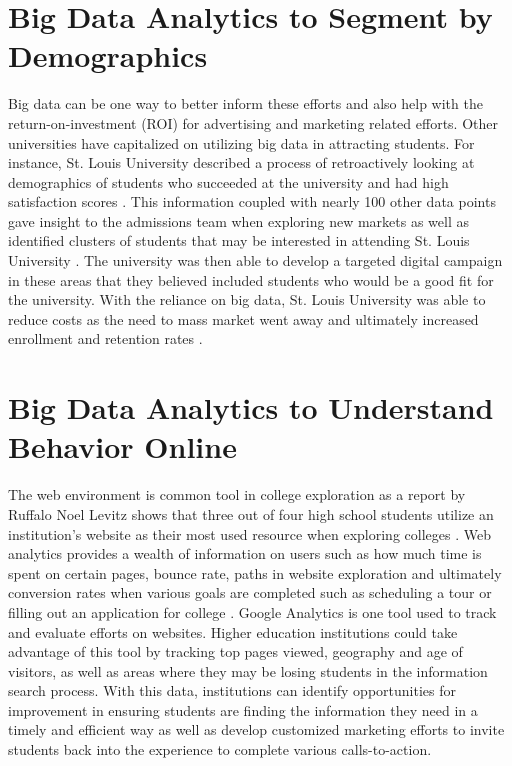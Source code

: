 \documentclass[sigconf]{acmart}
\begin{document}
\section{Big Data Analytics to Segment by Demographics}
Big data can be one way to better inform these efforts and also help with the return-on-investment (ROI) for advertising and marketing related efforts. Other universities have capitalized on utilizing big data in attracting students. For instance, St. Louis University described a process of retroactively looking at demographics of students who succeeded at the university and had high satisfaction scores \cite{Selingo2017}. This information coupled with nearly 100 other data points gave insight to the admissions team when exploring new markets as well as identified clusters of students that may be interested in attending St. Louis University \cite{Selingo2017}. The university was then able to develop a targeted digital campaign in these areas that they believed included students who would be a good fit for the university. With the reliance on big data, St. Louis University was able to reduce costs as the need to mass market went away and ultimately increased enrollment and retention rates \cite{Selingo2017}.  

\section{Big Data Analytics to Understand Behavior Online}
The web environment is common tool in college exploration as a report by Ruffalo Noel Levitz shows that three out of four high school students utilize an institution's website as their most used resource when exploring colleges \cite{Geyer2016}. Web analytics provides a wealth of information on users such as how much time is spent on certain pages, bounce rate, paths in website exploration and ultimately conversion rates when various goals are completed such as scheduling a tour or filling out an application for college \cite{Omidvar2011}. Google Analytics is one tool used to track and evaluate efforts on websites. Higher education institutions could take advantage of this tool by tracking top pages viewed, geography and age of visitors, as well as areas where they may be losing students in the information search process. With this data, institutions can identify opportunities for improvement in ensuring students are finding the information they need in a timely and efficient way as well as develop customized marketing efforts to invite students back into the experience to complete various calls-to-action. 
\end{document}
